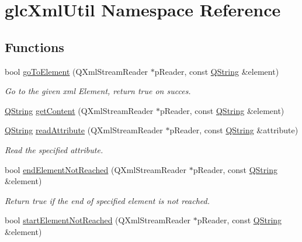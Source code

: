 \hypertarget{namespaceglc_xml_util}{\section{glc\-Xml\-Util Namespace Reference}
\label{namespaceglc_xml_util}
}
\subsection*{Functions}
\begin{DoxyCompactItemize}
\item 
bool \hyperlink{namespaceglc_xml_util_a45a1e3f962dcf04111c5e05c4d46f82f}{go\-To\-Element} (Q\-Xml\-Stream\-Reader $\ast$p\-Reader, const \hyperlink{group___u_a_v_objects_plugin_gab9d252f49c333c94a72f97ce3105a32d}{Q\-String} \&element)
\begin{DoxyCompactList}\small\item\em Go to the given xml Element, return true on succes. \end{DoxyCompactList}\item 
\hyperlink{group___u_a_v_objects_plugin_gab9d252f49c333c94a72f97ce3105a32d}{Q\-String} \hyperlink{namespaceglc_xml_util_aee74222990bf5d431e48ab73ba56bc30}{get\-Content} (Q\-Xml\-Stream\-Reader $\ast$p\-Reader, const \hyperlink{group___u_a_v_objects_plugin_gab9d252f49c333c94a72f97ce3105a32d}{Q\-String} \&element)
\item 
\hyperlink{group___u_a_v_objects_plugin_gab9d252f49c333c94a72f97ce3105a32d}{Q\-String} \hyperlink{namespaceglc_xml_util_a18deb46ab533470e95286c355a7fc7fe}{read\-Attribute} (Q\-Xml\-Stream\-Reader $\ast$p\-Reader, const \hyperlink{group___u_a_v_objects_plugin_gab9d252f49c333c94a72f97ce3105a32d}{Q\-String} \&attribute)
\begin{DoxyCompactList}\small\item\em Read the specified attribute. \end{DoxyCompactList}\item 
bool \hyperlink{namespaceglc_xml_util_a48d500528cc782d1eb9fc3aabb8dbaa8}{end\-Element\-Not\-Reached} (Q\-Xml\-Stream\-Reader $\ast$p\-Reader, const \hyperlink{group___u_a_v_objects_plugin_gab9d252f49c333c94a72f97ce3105a32d}{Q\-String} \&element)
\begin{DoxyCompactList}\small\item\em Return true if the end of specified element is not reached. \end{DoxyCompactList}\item 
bool \hyperlink{namespaceglc_xml_util_abba45dbf9ac8c140d9c874ff64a00122}{start\-Element\-Not\-Reached} (Q\-Xml\-Stream\-Reader $\ast$p\-Reader, const \hyperlink{group___u_a_v_objects_plugin_gab9d252f49c333c94a72f97ce3105a32d}{Q\-String} \&element)

\end{DoxyCompactItemize}
